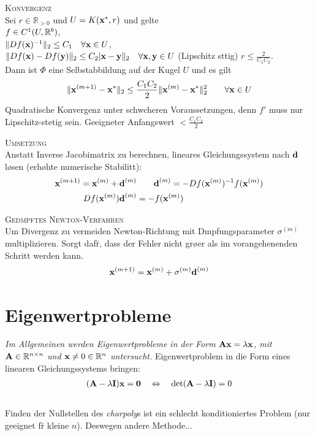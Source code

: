 \textsc{Konvergenz}\\
Sei $r\in \mathbb{R}_{>0}$ und $U= K(\mbox{\bf x}^*,r)$ und gelte \\
$f\in C^1(U,\mathbb{R}^{b})$,\\
 $\Vert Df(\mbox{\bf x})^{-1}\Vert_2 \leq C_1 \quad \forall \mbox{\bf x} \in U$,\\
$\Vert Df(\mbox{\bf x}) - Df(\mbox{\bf y})\Vert_2 \leq C_2 \vert \mbox{\bf x} - \mbox{\bf y} \Vert_2 \quad \forall \mbox{\bf x}, \mbox{\bf y} \in U$ (Lipschitz st\a tig)
$r\leq \frac{2}{C_1C_2}$.\\
Dann ist $\Phi$ eine Selbstabbildung auf der Kugel $U$ und es gilt
\begin{align*}
\Vert \mbox{\bf x}^{(m+1)} - \mbox{\bf x}^*\Vert_2 \leq \frac{C_1C_2}{2}\Vert \mbox{\bf x}^{(m)} - \mbox{\bf x}^* \Vert_2^2 \qquad \forall \mbox{\bf x}\in U
\end{align*}
Quadratische Konvergenz unter schw\a cheren Voraussetzungen, denn $f'$ muss nur Lipschitz-stetig sein. Geeigneter Anfangswert $<\frac{C_1C_2}{2}$ \vspace{0.2cm}

\textsc{Umsetzung}\\
Anstatt Inverse Jacobimatrix zu berechnen, lineares Gleichungssystem nach $\mbox{\bf d}$ l\o sen (erh\o hte numerische Stabilit\a t):
\begin{align*}
\mbox{\bf x}^{(m+1)} = \mbox{\bf x}^{(m)} + \mbox{\bf d}^{(m)} &\qquad \mbox{\bf d}^{(m)} = -Df(\mbox{\bf x}^{(m)})^{-1}f(\mbox{\bf x}^{(m)})\\
Df(\mbox{\bf x}^{(m)})\mbox{\bf d}^{(m)} &= -f(\mbox{\bf x}^{(m)})
\end{align*}

\textsc{Ged\a mpftes Newton-Verfahren}\\
Um Divergenz zu vermeiden Newton-Richtung mit D\a mpfungsparameter $\sigma^{(m)}$ multiplizieren. Sorgt daf\u r, dass der Fehler nicht gr\o \s er als im vorangehenenden Schritt werden kann.
\begin{align*}
\mbox{\bf x}^{(m+1)} = \mbox{\bf x}^{(m)} + \sigma^{(m)}\mbox{\bf d}^{(m)}
\end{align*}

\section{Eigenwertprobleme}
\emph{Im Allgemeinen werden Eigenwertprobleme in der Form $\mbox{\bf Ax}=\lambda \mbox{\bf x}$, mit $\mbox{\bf A}\in \mathbb{R}^{n \times n}$ und $\mbox{\bf x}\neq 0 \in \mathbb{R}^{n}$ untersucht.}
Eigenwertproblem in die Form eines linearen Gleichungssystems bringen:
\begin{align*}
(\mbox{\bf A} - \lambda \mbox{\bf I}) \mbox{\bf x} = \mbox{\bf 0} \quad \Leftrightarrow \quad \det(\mbox{\bf A}-\lambda \mbox{\bf I}) = 0
\end{align*}\\
Finden der Nullstellen des \emph{charpoly}s ist ein schlecht konditioniertes Problem (nur geeignet f\u r kleine $n$). Deswegen andere Methode...\\
